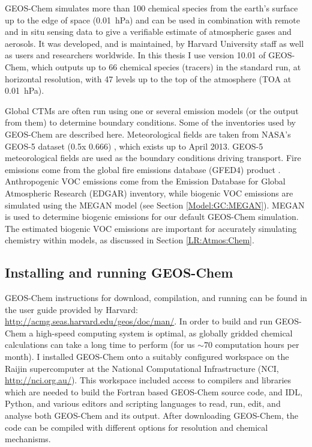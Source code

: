     GEOS-Chem simulates more than 100 chemical species from the earth's surface up to the edge of space (0.01~hPa) and can be used in combination with remote and in situ sensing data to give a verifiable estimate of atmospheric gases and aerosols.
    It was developed, and is maintained, by Harvard University staff as well as users and researchers worldwide.
    In this thesis I use version 10.01 of GEOS-Chem, which outputs up to 66 chemical species (tracers) in the standard run, at \lowhr horizontal resolution, with 47 levels up to the top of the atmosphere (TOA at 0.01~hPa). 
    
    
    Global CTMs are often run using one or several emission models (or the output from them) to determine boundary conditions.
    Some of the inventories used by GEOS-Chem are described here.
    Meteorological fields are taken from NASA's GEOS-5 dataset (0.5\degr x 0.666\degr) \parencite{Chen2009}, which exists up to April 2013.
    GEOS-5 meteorological fields are used as the boundary conditions driving transport.
    Fire emissions come from the global fire emissions database (GFED4) product \parencite{Giglio2013}. 
    Anthropogenic VOC emissions come from the Emission Database for Global Atmospheric Research (EDGAR) inventory, while biogenic VOC emissions are simulated using the MEGAN model (see Section \ref{Model:GC:MEGAN}).
    MEGAN is used to determine biogenic emissions for our default GEOS-Chem simulation.
    The estimated biogenic VOC emissions are important for accurately simulating chemistry within models, as discussed in Section \ref{LR:Atmos:Chem}.
    
  
  \subsection{Installing and running GEOS-Chem}
    \label{Model:GC:running}
    GEOS-Chem instructions for download, compilation, and running can be found in the user guide provided by Harvard: \url{http://acmg.seas.harvard.edu/geos/doc/man/}.
    In order to build and run GEOS-Chem a high-speed computing system is optimal, as globally gridded chemical calculations can take a long time to perform (for us $\sim 70$ computation hours per month).
    I installed GEOS-Chem onto a suitably configured workspace on the Raijin supercomputer at the National Computational Infrastructure (NCI, \url{http://nci.org.au/}).
    This workspace included access to compilers and libraries which are needed to build the Fortran based GEOS-Chem source code, and IDL, Python, and various editors and scripting languages to read, run, edit, and analyse both GEOS-Chem and its output.
    After downloading GEOS-Chem, the code can be compiled with different options for resolution and chemical mechanisms.
  
